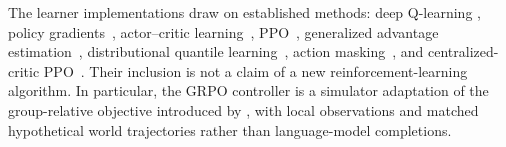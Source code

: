 The learner implementations draw on established methods: deep Q-learning
\citep{mnih2013dqn}, policy gradients~\citep{williams1992reinforce},
actor--critic learning~\citep{mnih2016asynchronous}, PPO~\citep{schulman2017ppo},
generalized advantage estimation~\citep{schulman2015gae}, distributional quantile
learning~\citep{dabney2018quantile}, action masking~\citep{huang2020masking}, and
centralized-critic PPO~\citep{yu2022mappo}. Their inclusion is not a claim of a
new reinforcement-learning algorithm. In particular, the GRPO controller is a
simulator adaptation of the group-relative objective introduced by
\citet{shao2024deepseekmath}, with local observations and matched hypothetical
world trajectories rather than language-model completions.
